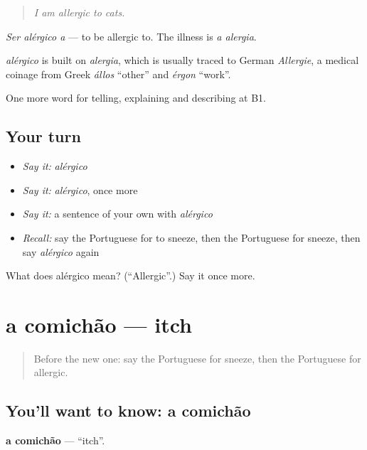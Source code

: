 \begin{quote}
\emph{I am allergic to cats.}
\end{quote}

\emph{Ser alérgico a} — to be allergic to. The illness is \emph{a alergia}.

\begin{cousinweb}
\emph{alérgico} is built on \emph{alergia}, which is usually traced to German \emph{Allergie}, a medical coinage from Greek \emph{állos} \textquotedblleft{}other\textquotedblright{} and \emph{érgon} \textquotedblleft{}work\textquotedblright{}.
\end{cousinweb}

\begin{grammarlens}[title={What you've built}]
One more word for telling, explaining and describing at B1.
\end{grammarlens}

\subsection*{Your turn}
\begin{itemize}
\raggedright
  \item \emph{Say it:} \emph{alérgico}
  \item \emph{Say it:} \emph{alérgico}, once more
  \item \emph{Say it:} a sentence of your own with \emph{alérgico}
  \item \emph{Recall:} say the Portuguese for to sneeze, then the Portuguese for sneeze, then say \emph{alérgico} again
\end{itemize}

\begin{tcolorbox}[breakable,colback=teal!4,colframe=teal!35!black,title={Before you move on}]
What does alérgico mean? (\textquotedblleft{}Allergic\textquotedblright{}.) Say it once more.
\end{tcolorbox}
\section[a comichão]{a comichão — itch}

\label{lesson:PT-C483-comichao}



\begin{quote}
Before the new one: say the Portuguese for sneeze, then the Portuguese for allergic.
\end{quote}

\subsection*{You'll want to know: a comichão}
\textbf{a comichão} — \textquotedblleft{}itch\textquotedblright{}.

